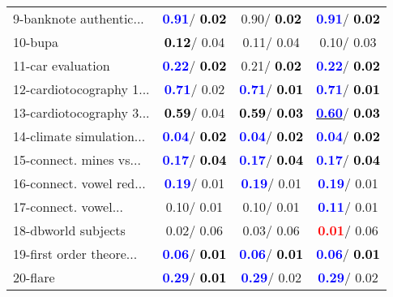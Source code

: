 \begin{table}[h]
\begin{center}
\begin{tabular}{lc|c|c}
9-banknote authentic... & \textcolor{blue}{\textbf{  0.91}}/\textcolor{black}{\textbf{  0.02}} &   0.90/\textcolor{black}{\textbf{  0.02}} & \textcolor{blue}{\textbf{  0.91}}/\textcolor{black}{\textbf{  0.02}} \\
10-bupa & \textcolor{black}{\textbf{  0.12}}/  0.04 &   0.11/  0.04 &   0.10/  0.03 \\
11-car evaluation & \textcolor{blue}{\textbf{  0.22}}/\textcolor{black}{\textbf{  0.02}} &   0.21/\textcolor{black}{\textbf{  0.02}} & \textcolor{blue}{\textbf{  0.22}}/\textcolor{black}{\textbf{  0.02}} \\
12-cardiotocography 1... & \textcolor{blue}{\textbf{  0.71}}/  0.02 & \textcolor{blue}{\textbf{  0.71}}/\textcolor{black}{\textbf{  0.01}} & \textcolor{blue}{\textbf{  0.71}}/\textcolor{black}{\textbf{  0.01}} \\
13-cardiotocography 3... & \textcolor{black}{\textbf{  0.59}}/  0.04 & \textcolor{black}{\textbf{  0.59}}/\textcolor{black}{\textbf{  0.03}} & \underline{\textcolor{blue}{\textbf{  0.60}}}/\textcolor{black}{\textbf{  0.03}} \\
14-climate simulation... & \textcolor{blue}{\textbf{  0.04}}/\textcolor{black}{\textbf{  0.02}} & \textcolor{blue}{\textbf{  0.04}}/\textcolor{black}{\textbf{  0.02}} & \textcolor{blue}{\textbf{  0.04}}/\textcolor{black}{\textbf{  0.02}} \\ \hline
15-connect. mines vs... & \textcolor{blue}{\textbf{  0.17}}/\textcolor{black}{\textbf{  0.04}} & \textcolor{blue}{\textbf{  0.17}}/\textcolor{black}{\textbf{  0.04}} & \textcolor{blue}{\textbf{  0.17}}/\textcolor{black}{\textbf{  0.04}} \\
16-connect. vowel red... & \textcolor{blue}{\textbf{  0.19}}/  0.01 & \textcolor{blue}{\textbf{  0.19}}/  0.01 & \textcolor{blue}{\textbf{  0.19}}/  0.01 \\
17-connect. vowel... &   0.10/  0.01 &   0.10/  0.01 & \textcolor{blue}{\textbf{  0.11}}/  0.01 \\
18-dbworld subjects &   0.02/  0.06 &   0.03/  0.06 & \textcolor{red}{\textbf{  0.01}}/  0.06 \\
19-first order theore... & \textcolor{blue}{\textbf{  0.06}}/\textcolor{black}{\textbf{  0.01}} & \textcolor{blue}{\textbf{  0.06}}/\textcolor{black}{\textbf{  0.01}} & \textcolor{blue}{\textbf{  0.06}}/\textcolor{black}{\textbf{  0.01}} \\
20-flare & \textcolor{blue}{\textbf{  0.29}}/\textcolor{black}{\textbf{  0.01}} & \textcolor{blue}{\textbf{  0.29}}/  0.02 & \textcolor{blue}{\textbf{  0.29}}/  0.02 \\

\end{tabular}
\end{center}
\end{table}
